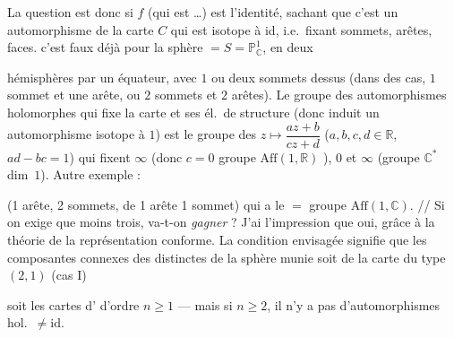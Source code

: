 \documentclass[11pt,a4paper]{article}
\begin{document}

La question est donc si $f$ (qui est  \ldots) est l'identité, sachant
que c'est un automorphisme de la carte $C$
qui est isotope à id, i.e.\ fixant sommets,
arêtes, faces.  c'est faux déjà pour
la sphère  $= S = \mathbb{P}^{1}_{\mathbb{C}}$,  en deux

hémisphères par un équateur, avec $1$ ou
deux sommets dessus (dans  des
cas, $1$ sommet et une arête, ou $2$ sommets
et $2$ arêtes). Le groupe des automorphismes
holomorphes qui fixe la carte et ses
él.\ de structure (donc induit un
automorphisme isotope à $1$) est le groupe des
$z \mapsto \dfrac{az+b}{cz+d}$ ($a, b, c, d \in \mathbb{R}$, $ad - bc = 1$) qui fixent
$\infty$ (donc $c = 0$  groupe $\mathrm{Aff}(1, \mathbb{R})$ \struck{\ill{} \ill{}}),
 $0$ et $\infty$ (groupe $\mathbb{C}^{*}$ \struck{\ill{}}  dim~$1$).
Autre exemple :


(1 arête, 2 sommets,
 de 1 arête 1 sommet) qui a
le $=$ groupe $\mathrm{Aff}(1, \mathbb{C})$. // Si on exige
que   
moins trois, va-t-on \emph{gagner} ? J'ai
l'impression que oui, grâce à la
théorie de la représentation conforme.
La condition envisagée signifie que
les composantes connexes des  
distinctes de la sphère munie
soit de la carte du type $(2, 1)$ (cas I)

soit les cartes d' d'ordre $n \geqslant 1$
--- mais si $n \geqslant 2$, il n'y a pas
d'automorphismes hol.\ $\neq \mathrm{id}$.
\end{document}
